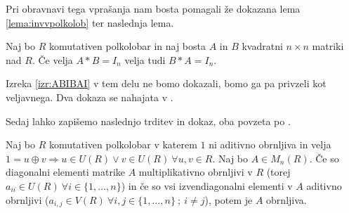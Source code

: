 \documentclass[mat1]{fmfdelo}
\begin{document}
Pri obravnavi tega vprašanja nam bosta pomagali že dokazana lema \ref{lema:invvpolkolob} ter naslednja lema.

\begin{izrek}\label{izr:ABIBAI}
	Naj bo $R$ komutativen polkolobar in naj bosta $A$ in $B$ kvadratni $n\times n$ matriki nad $R$. Če velja $A*B = I_n$ velja tudi $B*A=I_n$.
\end{izrek}

Izreka \ref{izr:ABIBAI} v tem delu ne bomo dokazali, bomo ga pa privzeli kot veljavnega. Dva dokaza se nahajata v \cite[poglavje 3 in poglavje 4]{bib:Reutenauer}.

Sedaj lahko zapišemo naslednjo trditev in dokaz, oba povzeta po \cite[lema 2.\ 3.]{bib:Tanbase}.

\begin{trditev}\label{trd:obrnljMatr}
	Naj bo $R$ komutativen polkolobar v katerem $1$ ni aditivno obrnljiva in velja $1 = u \oplus v \Rightarrow u\in U(R) \lor v\in U(R)~\forall u, v \in R$. Naj bo $A\in M_n(R)$. Če so diagonalni elementi matrike $A$ multiplikativno obrnljivi v $R$ (torej $a_{ii}\in U(R)~\forall i \in \{1, \ldots, n\}$) in če so vsi izvendiagonalni elementi v $A$ aditivno obrnljivi ($a_{i,j}\in V(R)~\forall i, j\in \{1, \ldots, n\} ~;~i\neq j$), potem je $A$ obrnljiva.
\end{trditev}
\end{document}
